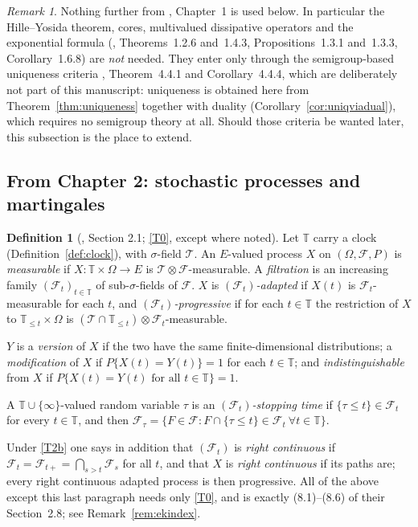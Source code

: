 \documentclass[11pt,a4paper]{article}
\theoremstyle{plain}
\theoremstyle{definition}
\newtheorem{definition}[theorem]{Definition}
\theoremstyle{remark}
\newtheorem{remark}[theorem]{Remark}
\newcommand{\T}{\mathbb{T}}                     %
\newcommand{\Filt}{\mathcal{F}}
\newcommand{\EK}{\cite{EK86}}
\begin{document}
\begin{remark}
  \label{rem:noch1}
  Nothing further from \EK, Chapter~1 is used below.  In particular the
  Hille--Yosida theorem, cores, multivalued dissipative operators and the
  exponential formula (\EK, Theorems~1.2.6 and~1.4.3, Propositions~1.3.1
  and~1.3.3, Corollary~1.6.8) are \emph{not} needed.  They enter only through the
  semigroup-based uniqueness criteria \EK, Theorem~4.4.1 and Corollary~4.4.4,
  which are deliberately not part of this manuscript: uniqueness is obtained here
  from Theorem~\ref{thm:uniqueness} together with duality
  (Corollary~\ref{cor:uniqviadual}), which requires no semigroup theory at all.
  Should those criteria be wanted later, this subsection is the place to extend.
\end{remark}

\subsection{From Chapter 2: stochastic processes and martingales}
\label{ssec:ch2}

\begin{definition}[\EK, Section 2.1; \eqref{T0}, except where noted]
  \label{def:process}
  Let $\T$ carry a clock (Definition~\ref{def:clock}), with $\sigma$-field
  $\mathcal{T}$.  An $E$-valued process $X$ on $(\Omega,\Filt,P)$ is
  \emph{measurable} if $X : \T \times \Omega \to E$ is
  $\mathcal{T} \otimes \Filt$-measurable.  A \emph{filtration} is an increasing
  family $(\Filt_t)_{t \in \T}$ of sub-$\sigma$-fields of $\Filt$.  $X$ is
  \emph{$(\Filt_t)$-adapted} if $X(t)$ is $\Filt_t$-measurable for each $t$, and
  \emph{$(\Filt_t)$-progressive} if for each $t \in \T$ the restriction of $X$ to
  $\T_{\leq t} \times \Omega$ is
  $(\mathcal{T} \cap \T_{\leq t}) \otimes \Filt_t$-measurable.

  $Y$ is a \emph{version} of $X$ if the two have the same finite-dimensional
  distributions; a \emph{modification} of $X$ if $P\{X(t) = Y(t)\} = 1$ for each
  $t \in \T$; and \emph{indistinguishable} from $X$ if
  $P\{X(t) = Y(t) \text{ for all } t \in \T\} = 1$.

  A $\T \cup \{\infty\}$-valued random variable $\tau$ is an
  \emph{$(\Filt_t)$-stopping time} if $\{\tau \leq t\} \in \Filt_t$ for every
  $t \in \T$, and then
  $\Filt_\tau = \{ F \in \Filt : F \cap \{\tau \leq t\} \in \Filt_t
  \ \forall t \in \T \}$.

  Under \eqref{T2b} one says in addition that $(\Filt_t)$ is \emph{right continuous} if
  $\Filt_t = \Filt_{t+} = \bigcap_{s>t}\Filt_s$ for all $t$, and that $X$ is
  \emph{right continuous} if its paths are; every right continuous adapted
  process is then progressive.  All of the above except this last paragraph
  needs only \eqref{T0}, and is exactly \EK{} (8.1)--(8.6) of their Section~2.8; see
  Remark~\ref{rem:ekindex}.
\end{definition}
\end{document}

